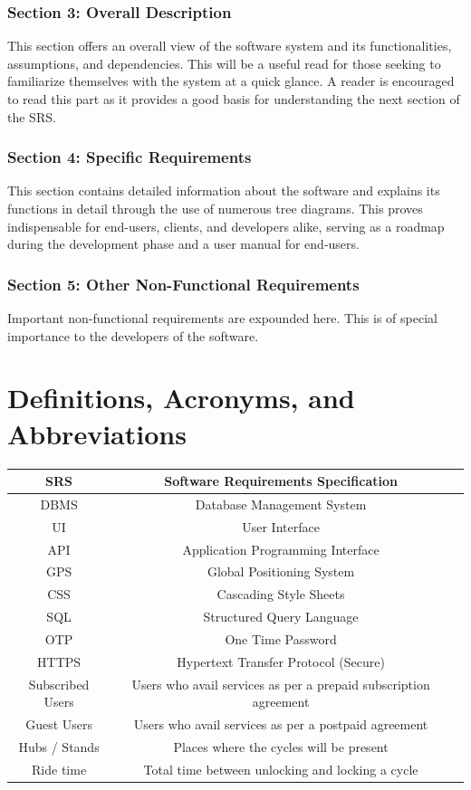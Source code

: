 \documentclass{scrreprt}
\begin{document}
\subsubsection*{Section 3: Overall Description}
This section offers an overall view of the software system and its functionalities, assumptions, and dependencies. This will be a useful read for those seeking to familiarize themselves with the system at a quick glance. A reader is encouraged to read this part as it provides a good basis for understanding the next section of the SRS.

\subsubsection*{Section 4: Specific Requirements}
This section contains detailed information about the software and explains its functions in detail through the use of numerous tree diagrams. This proves indispensable for end-users, clients, and developers alike, serving as a roadmap during the development phase and a user manual for end-users.

\subsubsection*{Section 5: Other Non-Functional Requirements}
Important non-functional requirements are expounded here. This is of special importance to the developers of the software.

\section{Definitions, Acronyms, and Abbreviations}
\begin{center}
\begin{tabular}{|c|c|p{}}
    \hline
    SRS & Software Requirements Specification \\
    \hline
    DBMS & Database Management System \\
    \hline
    UI & User Interface \\
    \hline
    API & Application Programming Interface \\
    \hline
    GPS & Global Positioning System \\
    \hline
    CSS & Cascading Style Sheets \\
    \hline
    SQL & Structured Query Language \\
    \hline
    OTP & One Time Password \\
    \hline
    HTTPS & Hypertext Transfer Protocol (Secure)\\
    \hline
    Subscribed Users & Users who avail services as per a prepaid subscription agreement \\
    \hline
    Guest Users & Users who avail services as per a postpaid agreement \\
    \hline
    Hubs / Stands & Places where the cycles will be present \\
    \hline
    Ride time & Total time between unlocking and locking a cycle \\
    \hline
\end{tabular}
\end{center}
\end{document}
